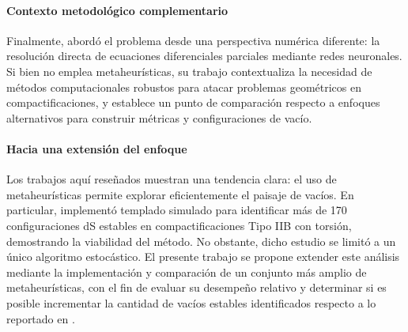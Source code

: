 \paragraph{Contexto metodológico complementario}

Finalmente, \cite{De_Luca_2025} abordó el problema desde una perspectiva
numérica diferente: la resolución directa de ecuaciones diferenciales
parciales mediante redes neuronales. Si bien no emplea metaheurísticas, su
trabajo contextualiza la necesidad de métodos computacionales robustos
para atacar problemas geométricos en compactificaciones, y establece un
punto de comparación respecto a enfoques alternativos para construir
métricas y configuraciones de vacío.

\paragraph{Hacia una extensión del enfoque}

Los trabajos aquí reseñados muestran una tendencia clara: el uso de
metaheurísticas permite explorar eficientemente el paisaje de vacíos. En
particular, \cite{Damian_2022} implementó templado simulado para
identificar más de 170 configuraciones dS estables en compactificaciones
Tipo IIB con torsión, demostrando la viabilidad del método. No obstante,
dicho estudio se limitó a un único algoritmo estocástico. El presente
trabajo se propone extender este análisis mediante la implementación
y comparación de un conjunto más amplio de metaheurísticas, con el fin de
evaluar su desempeño relativo y determinar si es posible incrementar la
cantidad de vacíos estables identificados respecto a lo reportado en
\cite{Damian_2022}.
